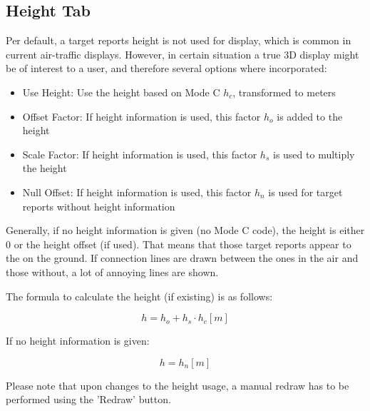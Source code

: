 \subsection{Height Tab}

Per default, a target reports height is not used for display, which is common in current air-traffic displays. However, in certain situation a true 3D display might be of interest to a user, and therefore several options where incorporated:



\begin{itemize}
 \item Use Height: Use the height based on Mode C $h_c$, transformed to meters
 \item Offset Factor: If height information is used, this factor $h_o$ is added to the height
 \item Scale Factor: If height information is used, this factor $h_s$ is used to multiply the height
 \item Null Offset: If height information is used, this factor $h_n$ is used for target reports without height information
\end{itemize}

Generally, if no height information is given (no Mode C code), the height is either $0$ or the height offset (if used). That means that those target reports appear to the on the ground. If connection lines are drawn between the ones in the air and those without, a lot of annoying lines are shown.

The formula to calculate the height (if existing) is as follows:

$$ h = h_o + h_s \cdot h_c [m]$$ 

If no height information is given:

$$ h = h_n [m]$$ 

Please note that upon changes to the height usage, a manual redraw has to be performed using the 'Redraw' button.



